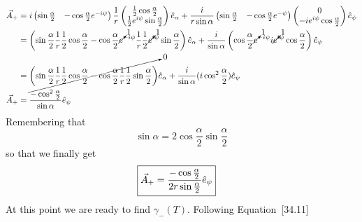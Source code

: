 \documentclass{jhwhw}
\begin{document}
\begin{align}
     \vec{A}_+
     &=
     i
     \begin{pmatrix}
        \sin{\frac{\alpha}{2}}  &   -\cos{\frac{\alpha}{2}}e^{-i \psi}
     \end{pmatrix}
     \frac{1}{r}
     \begin{pmatrix}
        \frac{1}{2}\cos{\frac{\alpha}{2}} \\
        \frac{1}{2}e^{i \psi}\sin{\frac{\alpha}{2}}
     \end{pmatrix}
     \hat{e}_\alpha
     +
     \frac{i}{r \sin{\alpha}}
     \begin{pmatrix}
        \sin{\frac{\alpha}{2}}  &   -\cos{\frac{\alpha}{2}}e^{-\psi}
     \end{pmatrix}
     \begin{pmatrix}
        0   \\
        -i e^{i \psi} \cos{\frac{\alpha}{2}}
     \end{pmatrix}
     \hat{e}_{\psi}
     \\
     &=
     \left(
     \sin{\frac{\alpha}{2}}\frac{1}{r}\frac{1}{2}\cos{\frac{\alpha}{2}}-\cos{\frac{\alpha}{2}}\cancelto{1}e^{-i \psi}\frac{1}{r}\frac{1}{2}\cancelto{1}e^{i \psi}\sin{\frac{\alpha}{2}}
     \right) \hat{e}_\alpha
     +
     \frac{i}{\sin{\alpha}}
     \left(
     \cos{\frac{\alpha}{2}}\cancelto{1}e^{-i\psi}i \cancelto{1}e^{i \psi}\cos{\frac{\alpha}{2}}
     \right)\hat{e}_{\psi}
     \\
     &=
     \cancelto{0}{\left(
     \sin{\frac{\alpha}{2}}\frac{1}{r}\frac{1}{2}\cos{\frac{\alpha}{2}}-\cos{\frac{\alpha}{2}}\frac{1}{r}\frac{1}{2}\sin{\frac{\alpha}{2}}
      \right)} \hat{e}_\alpha
      +
      \frac{i}{\sin{\alpha}}(i\cos^2{\frac{\alpha}{2}})\hat{e}_{\psi}
      \\
      \vec{A}_+
      &=
       \frac{-\cos^2{\frac{\alpha}{2}}}{\sin{\alpha}}\hat{e}_{\psi}
\end{align}
Remembering that
\begin{equation}
    \sin{\alpha} = 2 \cos{\frac{\alpha}{2}}\sin{\frac{\alpha}{2}}
\end{equation}
so that we finally get
\begin{align}
    \Aboxed{
    \vec{A}_+
      &=
       \frac{-\cos{\frac{\alpha}{2}}}{2 r \sin{\frac{\alpha}{2}}}\hat{e}_{\psi}
       }
\end{align}
At this point we are ready to find $\gamma_-(T)$.  Following Equation~[34.11]
\end{document}
